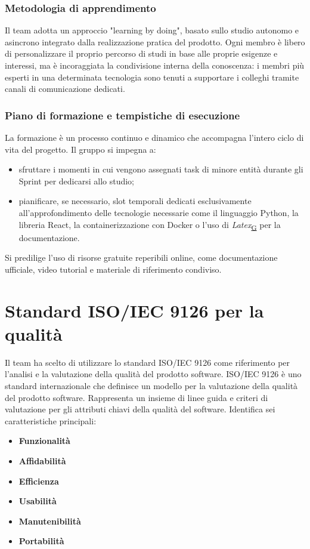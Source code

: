 \documentclass[a4paper,12pt]{article}
\begin{document}
        \subsubsection{Metodologia di apprendimento}
            Il team adotta un approccio "learning by doing", basato sullo studio autonomo e asincrono integrato dalla realizzazione pratica del prodotto. Ogni membro è libero di personalizzare il proprio percorso di studi in base alle proprie esigenze e interessi, ma è incoraggiata la condivisione interna della conoscenza: i membri più esperti in una determinata tecnologia sono tenuti a supportare i colleghi tramite canali di comunicazione dedicati.

        \subsubsection{Piano di formazione e tempistiche di esecuzione}
            La formazione è un processo continuo e dinamico che accompagna l'intero ciclo di vita del progetto. Il gruppo si impegna a: 
            \begin{itemize}
                \item sfruttare i momenti in cui vengono assegnati task di minore entità durante gli Sprint per dedicarsi allo studio; 
                \item pianificare, se necessario, slot temporali dedicati esclusivamente all'approfondimento delle tecnologie necessarie come il linguaggio Python, la libreria React, la containerizzazione con Docker o l'uso di \textit{Latex}\textsubscript{\href{https://atlasteam9.github.io/Atlas/glossario.html\#LaTeX}{G}} per la documentazione.
            \end{itemize}  
            Si predilige l'uso di risorse gratuite reperibili online, come documentazione ufficiale, video tutorial e materiale di riferimento condiviso.   

\newpage
            
\section{Standard ISO/IEC 9126 per la qualità}
\label{sec:qualStd}
Il team ha scelto di utilizzare lo standard ISO/IEC 9126 come riferimento per l'analisi e la valutazione della qualità del prodotto software. ISO/IEC 9126 è uno standard internazionale che definisce un modello per la valutazione della qualità del prodotto software. Rappresenta un insieme di linee guida e criteri di valutazione per gli attributi chiavi della qualità del software. Identifica sei caratteristiche principali:
\begin{itemize}
    \item \textbf{Funzionalità}
    \item \textbf{Affidabilità}
    \item \textbf{Efficienza}
    \item \textbf{Usabilità}
    \item \textbf{Manutenibilità}
    \item \textbf{Portabilità}
\end{itemize}
\end{document}
